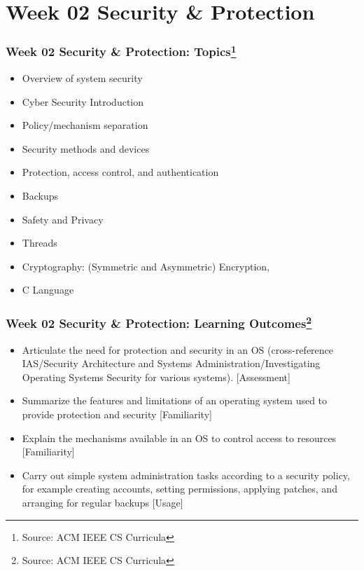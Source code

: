 
\section{Week 02 Security \& Protection}
\begin{frame}[fragile]
\frametitle{Week 02 Security \& Protection:
Topics\footnote{Source: ACM IEEE CS Curricula}}

\begin{itemize}
\item Overview of system security 
\item Cyber Security Introduction
\item Policy/mechanism separation 
\item Security methods and devices 
\item Protection, access control, and authentication 
\item Backups 
\item Safety and Privacy
\item Threads
\item Cryptography: (Symmetric and Asymmetric) Encryption,
\item C Language
\end{itemize}

\end{frame}

\begin{frame}[fragile]
\frametitle{Week 02 Security \& Protection:
Learning Outcomes\footnote{Source: ACM IEEE CS Curricula}}

\begin{itemize}
\item Articulate the need for protection and security in an OS (cross-reference IAS/Security Architecture and Systems Administration/Investigating Operating Systems Security for various systems). [Assessment]
\item Summarize the features and limitations of an operating system used to provide protection and security [Familiarity] 
\item Explain the mechanisms available in an OS to control access to resources [Familiarity] 
\item Carry out simple system administration tasks according to a security policy, for example creating accounts, setting permissions, applying patches, and arranging for regular backups [Usage] 
\end{itemize}
\end{frame}

